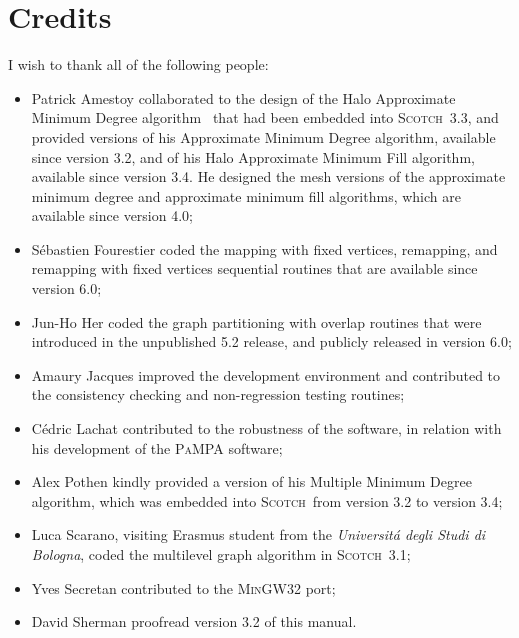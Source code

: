\documentclass{article}
\newcommand{\scotch}{\textsc{Scotch}}               %
\begin{document}
\clearpage


\tableofcontents




\section*{Credits}

I wish to thank all of the following people:
\begin{itemize}
\item
Patrick Amestoy collaborated to the design of the Halo Approximate
Minimum Degree algorithm~\cite{peroam99} that had been embedded into
\scotch\ \textsc{3.3}, and provided versions of his Approximate Minimum
Degree algorithm, available since version \textsc{3.2}, and of his
Halo Approximate Minimum Fill algorithm, available since version
\textsc{3.4}. He designed the mesh versions of the approximate
minimum degree and approximate minimum fill algorithms, which are
available since version \textsc{4.0};
\item
S\'ebastien Fourestier coded the mapping with fixed vertices,
remapping, and remapping with fixed vertices sequential routines that
are available since version \textsc{6.0};
\item
Jun-Ho Her coded the graph partitioning with overlap routines that
were introduced in the unpublished \textsc{5.2} release, and publicly
released in version \textsc{6.0};
\item
Amaury Jacques improved the development environment and contributed to
the consistency checking and non-regression testing routines;
\item
C\'edric Lachat contributed to the robustness of the software, in
relation with his development of the \textsc{PaMPA} software;
\item
Alex Pothen kindly provided a version of his Multiple Minimum Degree
algorithm, which was embedded into \scotch\ from version \textsc{3.2} to
version \textsc{3.4};
\item
Luca Scarano, visiting Erasmus student from the \textit{Universit\'a
degli Studi di Bologna}, coded the multilevel graph algorithm
in \scotch\ \textsc{3.1};
\item
Yves Secretan contributed to the \textsc{MinGW32} port;
\item
David Sherman proofread version \textsc{3.2} of this manual.
\end{itemize}




\end{document}

